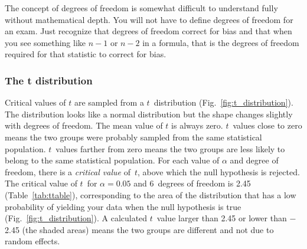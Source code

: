 \documentclass[12pt]{exam}
\begin{document}
The concept of degrees of freedom is somewhat difficult to understand fully without mathematical depth. You will not have to define degrees of freedom for an exam. Just recognize that degrees of freedom correct for bias and that when you see something like $n-1$ or $n-2$ in a formula, that is the degrees of freedom required for that statistic to correct for bias.


\newpage

\subsubsection*{The t distribution}

\newsavebox\ltmcbox

\begin{multicols}{2}

Critical values of $t$ are sampled from a $t$~distribution (Fig.~\ref{fig:t_distribution}). The distribution looks like a normal distribution but the shape  changes slightly with degrees of freedom. The mean value of $t$ is always zero. $t$~values close to zero means the two groups were probably sampled from the same statistical population. $t$~values farther from zero means the two groups are less likely to belong to the same statistical population. For each value of $\alpha$ and degree of freedom, there is a \emph{critical value} of~$t$, above which the null hypothesis is rejected. The critical value of $t$~for $\alpha = 0.05$ and 6~degrees of freedom is 2.45 (Table~\ref{tab:ttable}), corresponding to the area of the distribution that has a low probability of yielding your data when the null hypothesis is true (Fig.~\ref{fig:t_distribution}).  A calculated $t$~value larger than 2.45 or lower than $-$2.45 (the shaded areas) means the two groups are different and not due to random effects.

\columnbreak


\end{multicols}
\end{document}
